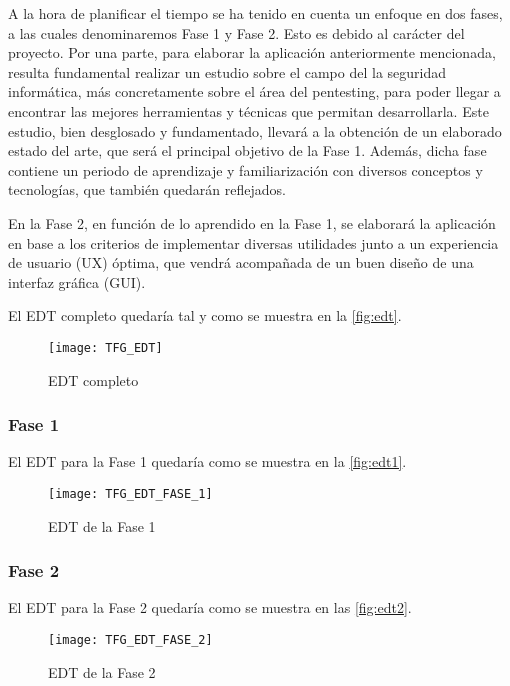 A la hora de planificar el tiempo se ha tenido en cuenta un enfoque en dos fases, a las cuales denominaremos Fase 1 y Fase 2. Esto es debido al carácter del proyecto. Por una parte, para elaborar la aplicación anteriormente mencionada, resulta fundamental realizar un estudio sobre el campo del la seguridad informática, más concretamente sobre el área del pentesting, para poder llegar a encontrar las mejores herramientas y técnicas que permitan desarrollarla. Este estudio, bien desglosado y fundamentado, llevará a la obtención de un elaborado estado del arte, que será el principal objetivo de la Fase 1. Además, dicha fase contiene un periodo de aprendizaje y familiarización con diversos conceptos y tecnologías, que también quedarán reflejados.

En la Fase 2, en función de lo aprendido en la Fase 1, se elaborará la aplicación en base a los criterios de implementar diversas utilidades junto a un experiencia de usuario (UX) óptima, que vendrá acompañada de un buen diseño de una interfaz gráfica (GUI).

El EDT completo quedaría tal y como se muestra en la \autoref{fig:edt}.

\begin{landscape}
	
	\begin{figure}[H]
		\centering
		\texttt{[image: TFG\_EDT]}
		\caption{EDT completo}
		\label{fig:edt}
	\end{figure}
	
	\clearpage
	
	\subsubsection{Fase 1}
	El EDT para la Fase 1 quedaría como se muestra en la \autoref{fig:edt1}.
	
	\begin{figure}[H]
		\centering
		\texttt{[image: TFG\_EDT\_FASE\_1]}
		\caption{EDT de la Fase 1}
		\label{fig:edt1}
	\end{figure}

\end{landscape}

\subsubsection{Fase 2}
El EDT para la Fase 2 quedaría como se muestra en las \autoref{fig:edt2}.

\begin{figure}[H]
	\centering
	\texttt{[image: TFG\_EDT\_FASE\_2]}
	\caption{EDT de la Fase 2}
	\label{fig:edt2}
\end{figure}

